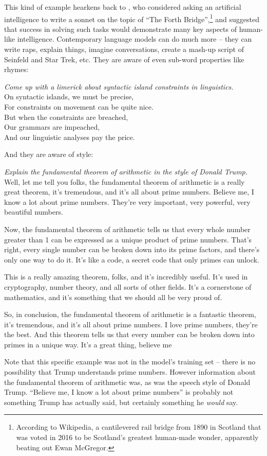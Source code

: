 \documentclass[output=paper,colorlinks,citecolor=brown
]{langscibook}
\begin{document}
This kind of example hearkens back to \citet{turing1950computing}, who considered asking an artificial intelligence to write a sonnet on the topic of ``The Forth Bridge'',\footnote{ According to Wikipedia, a cantilevered rail bridge from 1890 in Scotland that was voted in 2016 to be Scotland's greatest human-made wonder, apparently beating out Ewan McGregor.} and suggested that success in solving such tasks would demonstrate many key aspects of human-like intelligence. Contemporary language models can do much more -- they can write raps, explain things, imagine conversations, create a mash-up script of Seinfeld and Star Trek, etc. They are aware of even sub-word properties like rhymes:
\begin{myquote}
\textit{Come up with a limerick about syntactic island constraints in linguistics.}\medskip\\
\noindent On syntactic islands, we must be precise,\\
For constraints on movement can be quite nice.\\
But when the constraints are breached,\\
Our grammars are impeached,\\
And our linguistic analyses pay the price.
\end{myquote}
\noindent And they are aware of style:
\begin{myquote}
\textit{Explain the fundamental theorem of arithmetic in the style of Donald Trump.}\medskip\\
Well, let me tell you folks, the fundamental theorem of arithmetic is a really great theorem, it's tremendous, and it's all about prime numbers. Believe me, I know a lot about prime numbers. They're very important, very powerful, very beautiful numbers.

Now, the fundamental theorem of arithmetic tells us that every whole number greater than 1 can be expressed as a unique product of prime numbers. That's right, every single number can be broken down into its prime factors, and there's only one way to do it. It's like a code, a secret code that only primes can unlock.

This is a really amazing theorem, folks, and it's incredibly useful. It's used in cryptography, number theory, and all sorts of other fields. It's a cornerstone of mathematics, and it's something that we should all be very proud of.

So, in conclusion, the fundamental theorem of arithmetic is a fantastic theorem, it's tremendous, and it's all about prime numbers. I love prime numbers, they're the best. And this theorem tells us that every number can be broken down into primes in a unique way. It's a great thing, believe me
\end{myquote}
\noindent Note that this specific example was not in the model's training set -- there is no possibility that Trump understands prime numbers. However information about the fundamental theorem of arithmetic was, as was the speech style of Donald Trump. ``Believe me, I know a lot about prime numbers'' is probably not something Trump has actually said, but certainly something he \textit{would} say. 
\end{document}

